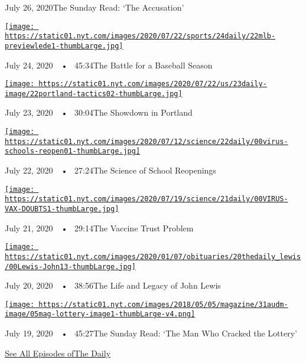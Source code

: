 July 26, 2020The Sunday Read: `The Accusation'

\href{https://www.nytimes.com/2020/07/24/podcasts/the-daily/mlb-baseball-season-coronavirus.html?action=click\&module=audio-series-bar\&region=header\&pgtype=Article}{\texttt{[image: https://static01.nyt.com/images/2020/07/22/sports/24daily/22mlb-previewlede1-thumbLarge.jpg]}}

July 24, 2020~~•~ 45:34The Battle for a Baseball Season

\href{https://www.nytimes.com/2020/07/23/podcasts/the-daily/portland-protests.html?action=click\&module=audio-series-bar\&region=header\&pgtype=Article}{\texttt{[image: https://static01.nyt.com/images/2020/07/22/us/23daily-image/22portland-tactics02-thumbLarge.jpg]}}

July 23, 2020~~•~ 30:04The Showdown in Portland

\href{https://www.nytimes.com/2020/07/22/podcasts/the-daily/school-reopenings-coronavirus.html?action=click\&module=audio-series-bar\&region=header\&pgtype=Article}{\texttt{[image: https://static01.nyt.com/images/2020/07/12/science/22daily/00virus-schools-reopen01-thumbLarge.jpg]}}

July 22, 2020~~•~ 27:24The Science of School Reopenings

\href{https://www.nytimes.com/2020/07/21/podcasts/the-daily/coronavirus-vaccine.html?action=click\&module=audio-series-bar\&region=header\&pgtype=Article}{\texttt{[image: https://static01.nyt.com/images/2020/07/19/science/21daily/00VIRUS-VAX-DOUBTS1-thumbLarge.jpg]}}

July 21, 2020~~•~ 29:14The Vaccine Trust Problem

\href{https://www.nytimes.com/2020/07/20/podcasts/the-daily/john-lewis.html?action=click\&module=audio-series-bar\&region=header\&pgtype=Article}{\texttt{[image: https://static01.nyt.com/images/2020/01/07/obituaries/20thedaily\_lewis/00Lewis-John13-thumbLarge.jpg]}}

July 20, 2020~~•~ 38:56The Life and Legacy of John Lewis

\href{https://www.nytimes.com/2020/07/19/podcasts/the-daily/lottery-winner-scam.html?action=click\&module=audio-series-bar\&region=header\&pgtype=Article}{\texttt{[image: https://static01.nyt.com/images/2018/05/05/magazine/31audm-image/05mag-lottery-image1-thumbLarge-v4.png]}}

July 19, 2020~~•~ 45:27The Sunday Read: `The Man Who Cracked the
Lottery'

\href{https://www.nytimes.com/column/the-daily}{See All Episodes ofThe
Daily}

